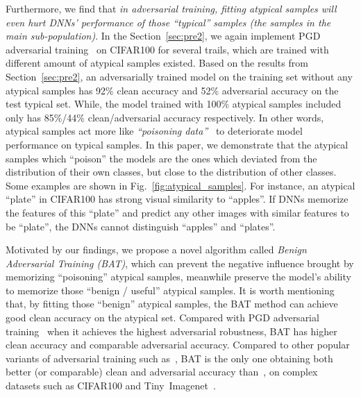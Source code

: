 Furthermore, we find that {\it in adversarial training, fitting atypical samples will even hurt DNNs' performance of those ``typical'' samples (the samples in the main sub-population)}. In the Section~\ref{sec:pre2}, we again implement PGD adversarial training~\cite{madry2017towards} on CIFAR100 for several trails, which are trained with different amount of atypical samples existed. 
Based on the results from Section~\ref{sec:pre2}, an adversarially trained model on the training set without any atypical samples has 92\% clean accuracy and 52\% adversarial accuracy on the test typical set. While, the model trained with 100\% atypical samples included only has 85\%/44\% clean/adversarial accuracy respectively. In other words, atypical samples act more like \textit{``poisoning data''}~\cite{biggio2012poisoning} to deteriorate model performance on typical samples. In this paper, we demonstrate that the atypical samples which ``poison'' the models are the ones which deviated from the distribution of their own classes, but close to the distribution of other classes. Some examples are shown in Fig.~\ref{fig:atypical_samples}. For instance, an atypical ``plate'' in CIFAR100 has strong visual similarity to ``apples''. If DNNs memorize the features of this ``plate'' and predict any other images with similar features to be ``plate'', the DNNs cannot distinguish ``apples'' and ``plates''.

Motivated by our findings, we propose a novel algorithm called \textit{Benign Adversarial Training (BAT)}, which can prevent the negative influence brought by memorizing ``poisoning'' atypical samples, meanwhile preserve the model's ability to memorize those ``benign / useful'' atypical samples. It is worth mentioning that, by fitting those ``benign'' atypical samples, the BAT method can achieve good clean accuracy on the atypical set. Compared with PGD adversarial training~\cite{madry2017towards} when it achieves the highest adversarial robustness, BAT has higher clean accuracy and comparable adversarial accuracy. Compared to other popular variants of adversarial training such as~\cite{zhang2019theoretically, wang2019improving, zhang2020geometry}, BAT is the only one obtaining both better (or comparable) clean and adversarial accuracy than~\cite{madry2017towards}, on complex datasets such as CIFAR100 and Tiny~Imagenet~\cite{le2015tiny}. 







